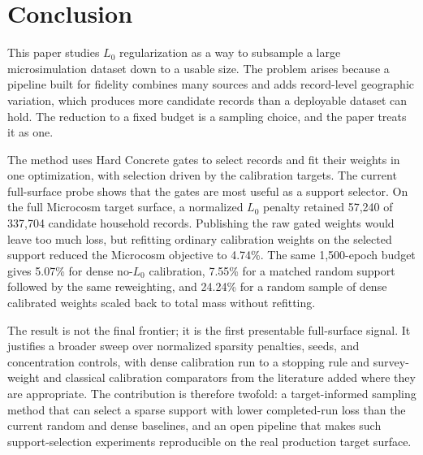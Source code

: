 \section{Conclusion}
\label{sec:conclusion}

This paper studies $L_0$ regularization as a way to subsample a large microsimulation dataset down to
a usable size. The problem arises because a pipeline built for fidelity combines many sources and
adds record-level geographic variation, which produces more candidate records than a deployable dataset
can hold. The reduction to a fixed budget is a sampling choice, and the paper treats it as one.

The method uses Hard Concrete gates to select records and fit their weights in one optimization, with
selection driven by the calibration targets. The current full-surface probe shows that the gates are most
useful as a support selector. On the full Microcosm target surface, a normalized $L_0$ penalty retained
57{,}240 of 337{,}704 candidate household records. Publishing the raw gated weights would leave too much
loss, but refitting ordinary calibration weights on the selected support reduced the Microcosm objective to
4.74\%. The same 1{,}500-epoch budget gives 5.07\% for dense no-$L_0$ calibration, 7.55\% for a matched
random support followed by the same reweighting, and 24.24\% for a random sample of dense calibrated
weights scaled back to total mass without refitting.

The result is not the final frontier; it is the first presentable full-surface signal. It justifies a
broader sweep over normalized sparsity penalties, seeds, and concentration controls, with dense
calibration run to a stopping rule and survey-weight and classical calibration comparators from the
literature added where they are appropriate. The contribution is therefore twofold: a target-informed sampling method
that can select a sparse support with lower completed-run loss than the current random and dense baselines,
and an open \microcosm{} pipeline that makes such support-selection experiments reproducible on the real
production target surface.
